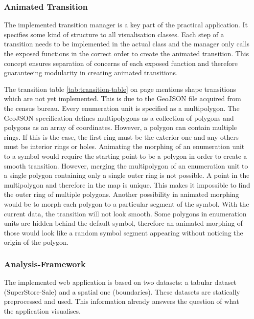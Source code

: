 \subsubsection{Animated Transition}
The implemented transition manager is a key part of the practical application. It specifies some kind of structure to all visualisation classes. Each step of a transition needs to be implemented in the actual class and the manager only calls the exposed functions in the correct order to create the animated transition. This concept ensures separation of concerns of each exposed function and therefore guaranteeing modularity in creating animated transitions.

The transition table \ref{tab:transition-table} on page \pageref{tab:transition-table} mentions shape transitions which are not yet implemented. This is due to the GeoJSON file acquired from the census bureau. Every enumeration unit is specified as a multipolygon. The GeoJSON specification defines multipolygons as a collection of polygons and polygons as an array of coordinates. However, a polygon can contain multiple rings. If this is the case, the first ring must be the exterior one and any others must be interior rings or holes.
Animating the morphing of an enumeration unit to a symbol would require the starting point to be a polygon in order to create a smooth transition. However, merging the multipolygon of an enumeration unit to a single polygon containing only a single outer ring is not possible. A point in the multipolygon and therefore in the map is unique. This makes it impossible to find the outer ring of multiple polygons.
Another possibility in animated morphing would be to morph each polygon to a particular segment of the symbol. With the current data, the transition will not look smooth. Some polygons in enumeration units are hidden behind the default symbol, therefore an animated morphing of those would look like a random symbol segment appearing without noticing the origin of the polygon.

\subsubsection{Analysis-Framework}

The implemented web application is based on two datasets: a tabular dataset (SuperStore-Sale) and a spatial one (boundaries). These datasets are statically preprocessed and used. This information already answers the question of what the application visualises.

